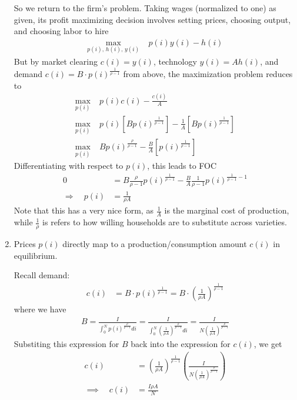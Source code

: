 \documentclass[12pt]{article}
\theoremstyle{plain}
\theoremstyle{definition}
\theoremstyle{remark}
\newcommand{\intzN}{\int_0^N}
\begin{document}
\begin{enumerate}
    So we return to the firm's problem. Taking wages (normalized to one)
    as given, its profit maximizing decision involves setting prices,
    choosing output, and choosing labor to hire
    \begin{align*}
      \max_{p(i), \,h(i), \,y(i)} \; &p(i) y(i) - h(i)
    \end{align*}
    But by market clearing $c(i)=y(i)$, technology $y(i)=Ah(i)$, and
    demand $c(i)=B \cdot p(i)^{\frac{1}{\rho-1}}$ from above, the
    maximization problem reduces to
    \begin{align*}
      \max_{p(i)} \; &p(i) c(i) - \frac{c(i)}{A} \\
      \max_{p(i)}
      \; &p(i) \left[B p(i)^{\frac{1}{\rho-1}}\right]
        - \frac{1}{A} \left[B p(i)^{\frac{1}{\rho-1}}\right] \\
      \max_{p(i)}
      \; & B p(i)^{\frac{\rho}{\rho-1}}
        - \frac{B}{A} \left[p(i)^{\frac{1}{\rho-1}}\right]
    \end{align*}
    Differentiating with respect to $p(i)$, this leads to FOC
    \begin{align*}
      0&=
      B {\frac{\rho}{\rho-1}} p(i)^{\frac{1}{\rho-1}}
        - \frac{B}{A} \frac{1}{\rho-1}p(i)^{\frac{1}{\rho-1}-1} \\
      \Rightarrow\quad
      p(i) &= \frac{1}{\rho A}
    \end{align*}
    Note that this has a very nice form, as $\frac{1}{A}$ is the
    marginal cost of production, while $\frac{1}{\rho}$ is refers to how
    willing households are to substitute across varieties.


  \item Prices $p(i)$ directly map to a production/consumption amount
    $c(i)$ in equilibrium.

    Recall demand:
    \begin{align*}
      c(i)
      &= B\cdot p(i)^{\frac{1}{\rho-1}}
      = B\cdot \left(\frac{1}{\rho A}\right)^{\frac{1}{\rho-1}}
    \end{align*}
    where we have
    \begin{align*}
      B
      = \frac{I}{\intzN p(i)^{\frac{\rho}{\rho-1}}di}
      =
      \frac{I}{\intzN \left(\frac{1}{\rho A}\right)^{\frac{\rho}{\rho-1}}di}
      =
      \frac{I}{N\left(\frac{1}{\rho A}\right)^{\frac{\rho}{\rho-1}}}
    \end{align*}
    Substiting this expression for $B$ back into the expression for
    $c(i)$, we get
    \begin{align*}
      c(i)
      &= \left(\frac{1}{\rho A}\right)^{\frac{1}{\rho-1}}
      \left(
      \frac{I}{N\left(\frac{1}{\rho A}\right)^{\frac{\rho}{\rho-1}}}
      \right) \\
      \implies\quad
      c(i)
      &= \frac{I\rho A}{N}
    \end{align*}
\end{enumerate}
\end{document}
